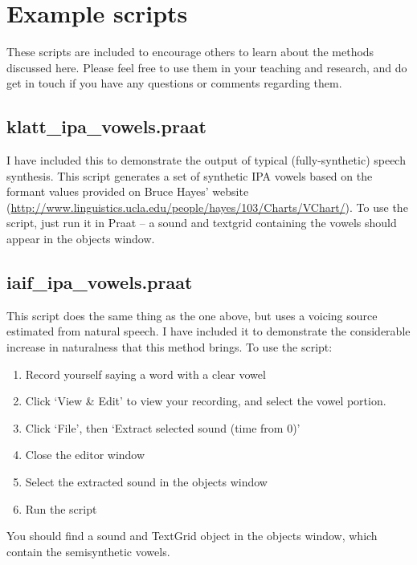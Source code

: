 \documentclass{article}\usepackage[]{graphicx}\usepackage[]{color}
\begin{document}
\newpage
\section*{Example scripts}
These scripts are included to encourage others to learn about the methods discussed here. Please feel free to use them in your teaching and research, and do get in touch if you have any questions or comments regarding them.
\subsection*{klatt\_ipa\_vowels.praat}
I have included this to demonstrate the output of typical (fully-synthetic) speech synthesis. This script generates a set of synthetic IPA vowels based on the formant values provided on Bruce Hayes' website (\url{http://www.linguistics.ucla.edu/people/hayes/103/Charts/VChart/}). To use the script, just run it in Praat -- a sound and textgrid containing the vowels should appear in the objects window.
\subsection*{iaif\_ipa\_vowels.praat}
This script does the same thing as the one above, but uses a voicing source estimated from natural speech. I have included it to demonstrate the considerable increase in naturalness that this method brings. To use the script:
\begin{enumerate}
\item{Record yourself saying a word with a clear vowel}
\item{Click `View \& Edit' to view your recording, and select the vowel portion.}
\item{Click `File', then `Extract selected sound (time from 0)'}
\item{Close the editor window}
\item{Select the extracted sound in the objects window}
\item{Run the script}
\end{enumerate}
You should find a sound and TextGrid object in the objects window, which contain the semisynthetic vowels.
\end{document}
